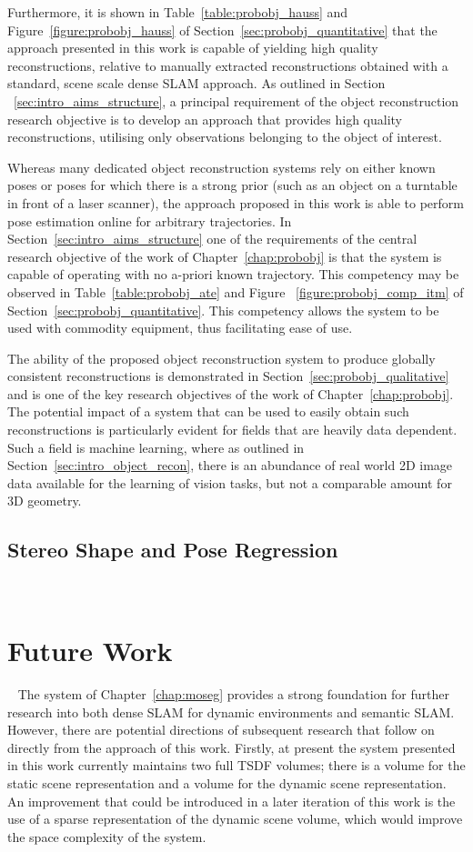 Furthermore, it is shown in Table~\ref{table:probobj_hauss} and Figure~\ref{figure:probobj_hauss} 
of Section~\ref{sec:probobj_quantitative} that the approach presented in this work is capable of 
yielding high quality reconstructions, relative to manually extracted reconstructions obtained 
with a standard, scene scale dense SLAM approach. As outlined in Section
~\ref{sec:intro_aims_structure}, a principal requirement of the object reconstruction research 
objective is to develop an approach that provides high quality reconstructions, utilising only 
observations belonging to the object of interest.

Whereas many dedicated object reconstruction systems rely on either known poses or poses for which 
there is a strong prior (such as an object on a turntable in front of a laser scanner), the approach 
proposed in this work is able to perform pose estimation online for arbitrary trajectories. In 
Section~\ref{sec:intro_aims_structure} one of the requirements of the central research objective of 
the work of Chapter~\ref{chap:probobj} is that the system is capable of operating with no a-priori
known trajectory. This competency may be observed in Table~\ref{table:probobj_ate} and Figure
~\ref{figure:probobj_comp_itm} of Section~\ref{sec:probobj_quantitative}. This competency allows 
the system to be used with commodity equipment, thus facilitating ease of use.

The ability of the proposed object reconstruction system to produce globally consistent reconstructions 
is demonstrated in Section~\ref{sec:probobj_qualitative} and is one of the key research objectives of the 
work of Chapter~\ref{chap:probobj}. The potential impact of a system that can be used to easily obtain such 
reconstructions is particularly evident for fields that are heavily data dependent. Such a field is machine 
learning, where as outlined in Section~\ref{sec:intro_object_recon}, there is an abundance of real world 2D 
image data available for the learning of vision tasks, but not a comparable amount for 3D geometry.

\subsection{Stereo Shape and Pose Regression}
~\label{subsec:discussion_spp}

\section{Future Work}
~\label{sec:discussion_limitations}
The system of Chapter~\ref{chap:moseg} provides a strong foundation for further research 
into both dense SLAM for dynamic environments and semantic SLAM\@. However, there are 
potential directions of subsequent research that follow on directly from the approach of 
this work. Firstly, at present the system presented in this work currently maintains two full 
TSDF volumes; there is a volume for the static scene representation and a volume for the dynamic 
scene representation. An improvement that could be introduced in a later iteration of this work 
is the use of a sparse representation of the dynamic scene volume, which would improve the space 
complexity of the system. 

